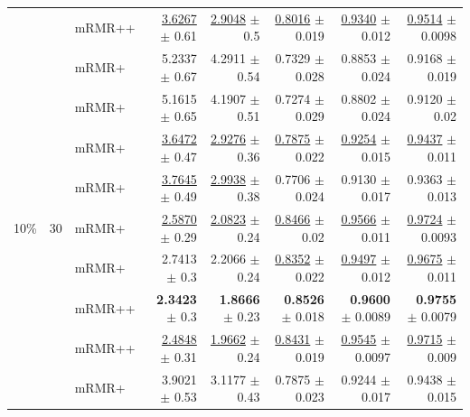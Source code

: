 \begin{longtable}{llp{}rrrrr}
 &  & mRMR++ & \underline{3.6267} {\scriptsize $\pm$ 0.61} & \underline{2.9048} {\scriptsize $\pm$ 0.5} & \underline{0.8016} {\scriptsize $\pm$ 0.019} & \underline{0.9340} {\scriptsize $\pm$ 0.012} & \underline{0.9514} {\scriptsize $\pm$ 0.0098} \\
 &  & mRMR+ & 5.2337 {\scriptsize $\pm$ 0.67} & 4.2911 {\scriptsize $\pm$ 0.54} & 0.7329 {\scriptsize $\pm$ 0.028} & 0.8853 {\scriptsize $\pm$ 0.024} & 0.9168 {\scriptsize $\pm$ 0.019} \\
 &  & mRMR+ & 5.1615 {\scriptsize $\pm$ 0.65} & 4.1907 {\scriptsize $\pm$ 0.51} & 0.7274 {\scriptsize $\pm$ 0.029} & 0.8802 {\scriptsize $\pm$ 0.024} & 0.9120 {\scriptsize $\pm$ 0.02} \\
 &  & mRMR+ & \underline{3.6472} {\scriptsize $\pm$ 0.47} & \underline{2.9276} {\scriptsize $\pm$ 0.36} & \underline{0.7875} {\scriptsize $\pm$ 0.022} & \underline{0.9254} {\scriptsize $\pm$ 0.015} & \underline{0.9437} {\scriptsize $\pm$ 0.011} \\
 &  & mRMR+ & \underline{3.7645} {\scriptsize $\pm$ 0.49} & \underline{2.9938} {\scriptsize $\pm$ 0.38} & 0.7706 {\scriptsize $\pm$ 0.024} & 0.9130 {\scriptsize $\pm$ 0.017} & 0.9363 {\scriptsize $\pm$ 0.013} \\
\midrule
10\% & 30 & mRMR+ & \underline{2.5870} {\scriptsize $\pm$ 0.29} & \underline{2.0823} {\scriptsize $\pm$ 0.24} & \underline{0.8466} {\scriptsize $\pm$ 0.02} & \underline{0.9566} {\scriptsize $\pm$ 0.011} & \underline{0.9724} {\scriptsize $\pm$ 0.0093} \\
 &  & mRMR+ & 2.7413 {\scriptsize $\pm$ 0.3} & 2.2066 {\scriptsize $\pm$ 0.24} & \underline{0.8352} {\scriptsize $\pm$ 0.022} & \underline{0.9497} {\scriptsize $\pm$ 0.012} & \underline{0.9675} {\scriptsize $\pm$ 0.011} \\
 &  & mRMR++ & \textbf{2.3423} {\scriptsize $\pm$ 0.3} & \textbf{1.8666} {\scriptsize $\pm$ 0.23} & \textbf{0.8526} {\scriptsize $\pm$ 0.018} & \textbf{0.9600} {\scriptsize $\pm$ 0.0089} & \textbf{0.9755} {\scriptsize $\pm$ 0.0079} \\
 &  & mRMR++ & \underline{2.4848} {\scriptsize $\pm$ 0.31} & \underline{1.9662} {\scriptsize $\pm$ 0.24} & \underline{0.8431} {\scriptsize $\pm$ 0.019} & \underline{0.9545} {\scriptsize $\pm$ 0.0097} & \underline{0.9715} {\scriptsize $\pm$ 0.009} \\
 &  & mRMR+ & 3.9021 {\scriptsize $\pm$ 0.53} & 3.1177 {\scriptsize $\pm$ 0.43} & 0.7875 {\scriptsize $\pm$ 0.023} & 0.9244 {\scriptsize $\pm$ 0.017} & 0.9438 {\scriptsize $\pm$ 0.015} \\

\end{longtable}
